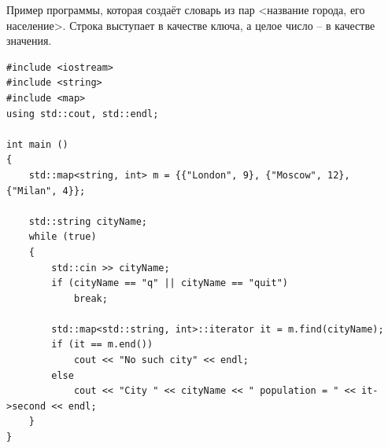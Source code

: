 \documentclass{article}
\begin{document}
Пример программы, которая создаёт словарь из пар <название города, его население>. Строка выступает в качестве ключа, а целое число -- в качестве значения.
\begin{lstlisting}
#include <iostream>
#include <string>
#include <map>
using std::cout, std::endl;

int main () 
{
    std::map<string, int> m = {{"London", 9}, {"Moscow", 12}, {"Milan", 4}};

    std::string cityName;
    while (true) 
    {
        std::cin >> cityName;
        if (cityName == "q" || cityName == "quit")
            break;
            
        std::map<std::string, int>::iterator it = m.find(cityName);
        if (it == m.end())
            cout << "No such city" << endl;
        else
            cout << "City " << cityName << " population = " << it->second << endl;
    }
}
\end{lstlisting}
\end{document}
